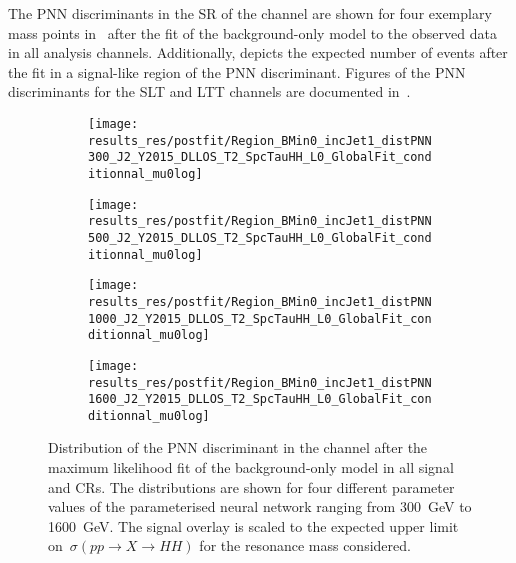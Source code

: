 The PNN discriminants in the SR of the \hadhad channel are shown for four
exemplary mass points in~ after the fit of the
background-only model to the observed data in all analysis channels.
Additionally,  depicts the expected number of
events after the fit in a signal-like region of the PNN discriminant. Figures of
the PNN discriminants for the \lephad SLT and LTT channels are documented
in~.

\begin{figure}[htbp]
  \centering

  \begin{subfigure}{0.495\textwidth}
    \centering

    \texttt{[image: results\_res/postfit/Region\_BMin0\_incJet1\_distPNN300\_J2\_Y2015\_DLLOS\_T2\_SpcTauHH\_L0\_GlobalFit\_conditionnal\_mu0log]}
  \end{subfigure}\hfill%
  \begin{subfigure}{0.495\textwidth}
    \centering

    \texttt{[image: results\_res/postfit/Region\_BMin0\_incJet1\_distPNN500\_J2\_Y2015\_DLLOS\_T2\_SpcTauHH\_L0\_GlobalFit\_conditionnal\_mu0log]}
  \end{subfigure}

  \begin{subfigure}{0.495\textwidth}
    \centering

    \texttt{[image: results\_res/postfit/Region\_BMin0\_incJet1\_distPNN1000\_J2\_Y2015\_DLLOS\_T2\_SpcTauHH\_L0\_GlobalFit\_conditionnal\_mu0log]}
    \label{fig:pnn1000_postfit}
  \end{subfigure}\hfill%
  \begin{subfigure}{0.495\textwidth}
    \centering

    \texttt{[image: results\_res/postfit/Region\_BMin0\_incJet1\_distPNN1600\_J2\_Y2015\_DLLOS\_T2\_SpcTauHH\_L0\_GlobalFit\_conditionnal\_mu0log]}
  \end{subfigure}

  \caption{Distribution of the PNN discriminant in the \hadhad channel after the
    maximum likelihood fit of the background-only model in all signal and
    CRs. The distributions are shown for four different parameter values of the
    parameterised neural network ranging from \SI{300}{\GeV} to
    \SI{1600}{\GeV}. The signal overlay is scaled to the expected upper limit
    on~$\sigma(pp \to X \to HH)$ for the resonance mass considered.}%
  \label{fig:resonant_mva_postfit}
\end{figure}


